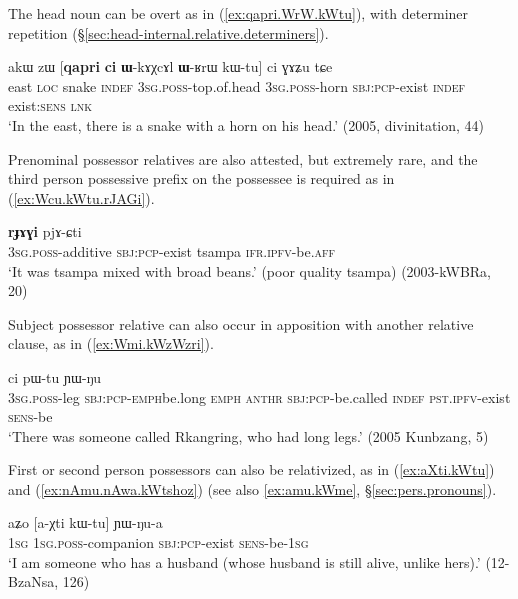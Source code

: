 The head noun can be overt  as in (\ref{ex:qapri.WrW.kWtu}), with determiner repetition (§\ref{sec:head-internal.relative.determiners}).


\begin{exe}
\ex \label{ex:qapri.WrW.kWtu}
\gll  akɯ zɯ [\textbf{qapri} \textbf{ci} \textbf{ɯ}-kɤχcɤl \textbf{ɯ}-ʁrɯ kɯ-tu] ci ɣɤʑu tɕe \\
east \textsc{loc} snake \textsc{indef} \textsc{3sg}.\textsc{poss}-top.of.head \textsc{3sg}.\textsc{poss}-horn \textsc{sbj}:\textsc{pcp}-exist \textsc{indef} exist:\textsc{sens} \textsc{lnk} \\
\glt `In the east, there is a snake with a horn on his head.' (2005, divinitation, 44)
\end{exe}

 
Prenominal possessor relatives are also attested, but extremely rare, and the third person possessive prefix on the possessee is required as in (\ref{ex:Wcu.kWtu.rJAGi}).

\begin{exe}
\ex \label{ex:Wcu.kWtu.rJAGi}
\gll  [\textbf{ɯ}-cu kɯ-tu] \textbf{rɟɤɣi} pjɤ-ɕti \\
\textsc{3sg}.\textsc{poss}-additive \textsc{sbj}:\textsc{pcp}-exist tsampa \textsc{ifr}.\textsc{ipfv}-be.\textsc{aff} \\
\glt `It was tsampa mixed with broad beans.' (poor quality tsampa) (2003-kWBRa, 20)
 \end{exe}

Subject possessor relative can also occur in apposition with another relative clause, as in (\ref{ex:Wmi.kWzWzri}).

\begin{exe}
 \ex \label{ex:Wmi.kWzWzri}
  ci pɯ-tu ɲɯ-ŋu \\
 \textsc{3sg}.\textsc{poss}-leg \textsc{sbj}:\textsc{pcp}-\textsc{emph}\redp{}be.long \textsc{emph}  \textsc{anthr} \textsc{sbj}:\textsc{pcp}-be.called \textsc{indef} \textsc{pst}.\textsc{ipfv}-exist \textsc{sens}-be \\
 \glt `There was someone called Rkangring, who had long legs.' (2005 Kunbzang, 5)
 \end{exe}

First or second person possessors can also be relativized, as in (\ref{ex:aXti.kWtu}) and (\ref{ex:nAmu.nAwa.kWtshoz}) (see also \ref{ex:amu.kWme}, §\ref{sec:pers.pronouns}).

\begin{exe}
\ex \label{ex:aXti.kWtu}
\gll aʑo [a-χti kɯ-tu] ɲɯ-ŋu-a \\
\textsc{1sg} \textsc{1sg}.\textsc{poss}-companion \textsc{sbj}:\textsc{pcp}-exist \textsc{sens}-be-\textsc{1sg} \\
\glt `I am someone who has a husband (whose husband is still alive, unlike hers).' (12-BzaNsa, 126)
\end{exe}

